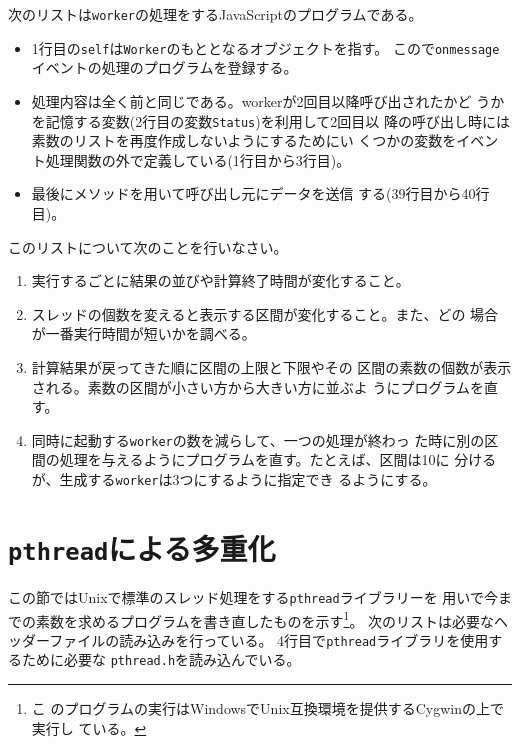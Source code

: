 \begin{Exec}
 次のリストは\Verb+worker+の処理をするJavaScriptのプログラムである。
 \begin{itemize}
  \item 1行目の\Verb+self+は\Verb+Worker+のもととなるオブジェクトを指す。
        こので\Verb+onmessage+イベントの処理のプログラムを登録する。
  \item 処理内容は全く前と同じである。workerが2回目以降呼び出されたかど
				うかを記憶する変数(2行目の変数\texttt{Status})を利用して2回目以
				降の呼び出し時には素数のリストを再度作成しないようにするためにい
				くつかの変数をイベント処理関数の外で定義している(1行目から3行目)。
  \item 最後にメソッドを用いて呼び出し元にデータを送信
        する(39行目から40行目)。
 \end{itemize}
\end{Exec}
 \begin{Prob}\upshape このリストについて次のことを行いなさい。
  \begin{enumerate}
   \item 実行するごとに結果の並びや計算終了時間が変化すること。
   \item スレッドの個数を変えると表示する区間が変化すること。また、どの
         場合が一番実行時間が短いかを調べる。
   \item 計算結果が戻ってきた順に区間の上限と下限やその
 区間の素数の個数が表示される。素数の区間が小さい方から大きい方に並ぶよ
 うにプログラムを直す。
   \item 同時に起動する\texttt{worker}の数を減らして、一つの処理が終わっ
         た時に別の区間の処理を与えるようにプログラムを直す。たとえば、区間は10に
         分けるが、生成する\texttt{worker}は3つにするように指定でき
         るようにする。
  \end{enumerate} 
 \end{Prob}
 \section{\texttt{pthread}による多重化}
 この節ではUnixで標準のスレッド処理をする\texttt{pthread}ライブラリーを
  用いで今までの素数を求めるプログラムを書き直したものを示す\footnote{こ
  のプログラムの実行はWindowsでUnix互換環境を提供するCygwinの上で実行し
  ている。}。
	次のリストは必要なヘッダーファイルの読み込みを行っている。
	4行目で\texttt{pthread}ライブラリを使用するために必要な
  \texttt{pthread.h}を読み込んでいる。

